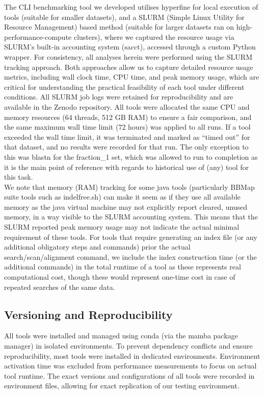 \documentclass[
]{article}
\begin{document}
The CLI benchmarking tool we developed utilises
hyperfine\autocite{Peter_hyperfine_2023} for local execution of tools
(suitable for smaller datasets), and a SLURM (Simple Linux Utility for
Resource Management\autocite{SLURM_2002}) based method (suitable for
larger datasets ran on high-performance-compute clusters), where we
captured the resource usage via SLURM's built-in accounting system
(sacct), accessed through a custom Python wrapper. For consistency, all
analyses herein were performed using the SLURM tracking approach. Both
approaches allow us to capture detailed resource usage metrics,
including wall clock time, CPU time, and peak memory usage, which are
critical for understanding the practical feasibility of each tool under
different conditions. All SLURM job logs were retained for
reproducibility and are available in the Zenodo repository. All tools
were allocated the same CPU and memory resources (64 threads, 512 GB
RAM) to ensure a fair comparison, and the same maximum wall time limit
(72 hours) was applied to all runs. If a tool exceeded the wall time
limit, it was terminated and marked as ``timed out'' for that dataset,
and no results were recorded for that run. The only exception to this
was blastn for the fraction\_1 set, which was allowed to run to
completion as it is the main point of reference with regards to
historical use of (any) tool for this task.\\
We note that memory (RAM) tracking for some java tools (particularly
BBMap suite tools such as indelfree.sh) can make it seem as if they use
all available memory as the java virtual machine may not explicitly
report cleared, unused memory, in a way visible to the SLURM accounting
system. This means that the SLURM reported peak memory usage may not
indicate the actual minimal requirement of these tools. For tools that
require generating an index file (or any additional obligatory steps and
commands) prior the actual search/scan/alignment command, we include the
index construction time (or the additional commands) in the total
runtime of a tool as these represents real computational cost, though
these would represent one-time cost in case of repeated searches of the
same data.

\subsection{Versioning and Reproducibility}\label{sec-reproducibility}

All tools were installed and managed using conda\autocite{conda} (via
the mamba\autocite{mamba} package manager) in isolated environments. To
prevent dependency conflicts and ensure reproducibility, most tools were
installed in dedicated environments. Environment activation time was
excluded from performance measurements to focus on actual tool runtime.
The exact versions and configurations of all tools were recorded in
environment files, allowing for exact replication of our testing
environment.
\end{document}
